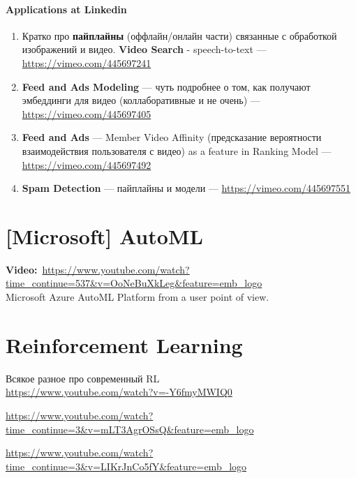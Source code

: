 \paragraph{Applications at Linkedin}

\begin{enumerate}
    \item Кратко про \textbf{пайплайны} (оффлайн/онлайн части) связанные с обработкой изображений и видео. \textbf{Video Search} - speech-to-text --- \url{https://vimeo.com/445697241}
    \item \textbf{Feed and Ads Modeling} --- чуть подробнее о том, как получают эмбеддинги для видео (коллаборативные и не очень) --- \url{https://vimeo.com/445697405}
    \item \textbf{Feed and Ads} --- Member Video Affinity (предсказание вероятности взаимодействия пользователя с видео) as a feature in Ranking Model --- \url{https://vimeo.com/445697492}
    \item \textbf{Spam Detection} --- пайплайны и модели --- \url{https://vimeo.com/445697551}
\end{enumerate}


\section*{[Microsoft] AutoML}
\textbf{Video:}~\url{https://www.youtube.com/watch?time_continue=537&v=OoNeBuXkLeg&feature=emb_logo} \\

Microsoft Azure AutoML Platform from a user point of view.


\section*{Reinforcement Learning}

Всякое разное про современный RL \\

\url{https://www.youtube.com/watch?v=-Y6fmyMWIQ0}

\url{https://www.youtube.com/watch?time_continue=3&v=mLT3AgrOSsQ&feature=emb_logo}

\url{https://www.youtube.com/watch?time_continue=3&v=LIKrJnCo5fY&feature=emb_logo}


